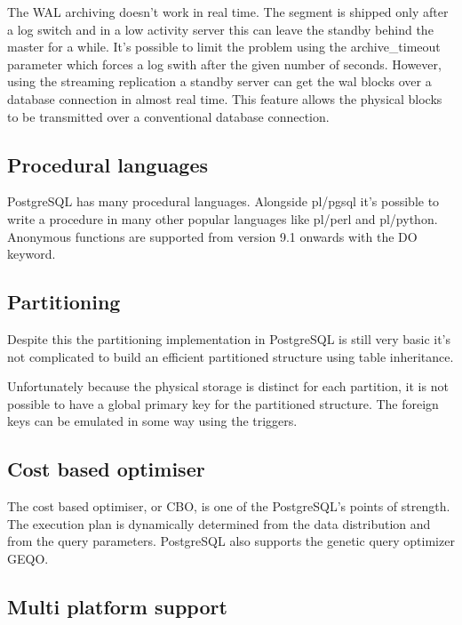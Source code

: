 The WAL archiving doesn't work in real time. The segment is shipped only after
a log switch and in a low activity server this can leave the standby behind the
master for a while. It's  possible to limit the problem using the
archive\_timeout parameter which forces a log swith after the given number of
seconds. However, using the streaming replication
a standby server can get the wal blocks over a database connection in almost
real time. This feature allows the physical blocks to be transmitted over a
conventional database connection.

\subsection{Procedural languages}

PostgreSQL has many procedural languages. Alongside pl/pgsql it's possible to
write a procedure in many other popular languages like pl/perl and pl/python.
Anonymous functions are supported from version 9.1 onwards with the DO keyword.

\subsection{Partitioning}

Despite this the partitioning
implementation in PostgreSQL is still very basic it's not complicated to build
an efficient partitioned structure using table inheritance.\newline

Unfortunately because the physical storage is distinct for each partition, it
is not possible to have a global primary key for the partitioned structure. The
foreign keys can be emulated in some way using the triggers.

\subsection{Cost based optimiser}

The cost based optimiser, or CBO, is one
of the PostgreSQL's points of strength. The execution plan is dynamically
determined from the data distribution and from the query parameters. PostgreSQL
also supports the genetic query optimizer GEQO.

\subsection{Multi platform support}

